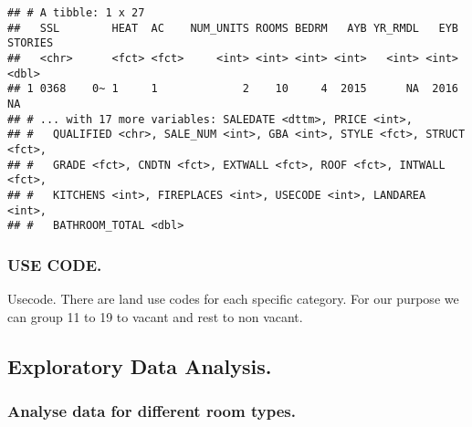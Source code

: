 \documentclass[]{article}
\newenvironment{Shaded}{\begin{snugshade}}{\end{snugshade}}
\newcommand{\CommentTok}[1]{\textcolor[rgb]{0.56,0.35,0.01}{\textit{#1}}}
\newcommand{\DataTypeTok}[1]{\textcolor[rgb]{0.13,0.29,0.53}{#1}}
\newcommand{\DecValTok}[1]{\textcolor[rgb]{0.00,0.00,0.81}{#1}}
\newcommand{\KeywordTok}[1]{\textcolor[rgb]{0.13,0.29,0.53}{\textbf{#1}}}
\newcommand{\NormalTok}[1]{#1}
\newcommand{\OperatorTok}[1]{\textcolor[rgb]{0.81,0.36,0.00}{\textbf{#1}}}
\newcommand{\StringTok}[1]{\textcolor[rgb]{0.31,0.60,0.02}{#1}}
\begin{document}
\begin{verbatim}
## # A tibble: 1 x 27
##   SSL        HEAT  AC    NUM_UNITS ROOMS BEDRM   AYB YR_RMDL   EYB STORIES
##   <chr>      <fct> <fct>     <int> <int> <int> <int>   <int> <int>   <dbl>
## 1 0368    0~ 1     1             2    10     4  2015      NA  2016      NA
## # ... with 17 more variables: SALEDATE <dttm>, PRICE <int>,
## #   QUALIFIED <chr>, SALE_NUM <int>, GBA <int>, STYLE <fct>, STRUCT <fct>,
## #   GRADE <fct>, CNDTN <fct>, EXTWALL <fct>, ROOF <fct>, INTWALL <fct>,
## #   KITCHENS <int>, FIREPLACES <int>, USECODE <int>, LANDAREA <int>,
## #   BATHROOM_TOTAL <dbl>
\end{verbatim}

\hypertarget{use-code.}{%
\subsubsection{USE CODE.}\label{use-code.}}

Usecode. There are land use codes for each specific category. For our
purpose we can group 11 to 19 to vacant and rest to non vacant.

\begin{Shaded}
\end{Shaded}

\hypertarget{exploratory-data-analysis.}{%
\subsection{Exploratory Data
Analysis.}\label{exploratory-data-analysis.}}

\hypertarget{analyse-data-for-different-room-types.}{%
\subsubsection{Analyse data for different room
types.}\label{analyse-data-for-different-room-types.}}
\end{document}
